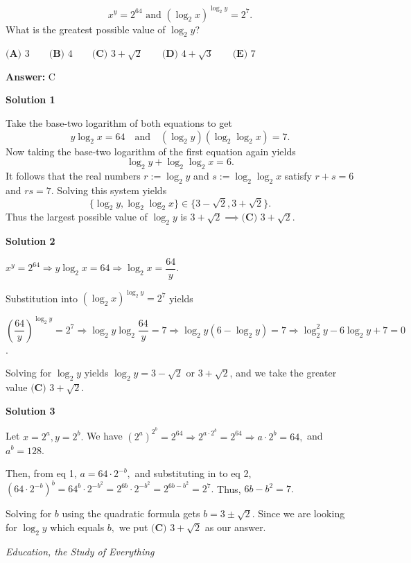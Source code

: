 \begin{enumerate}
 \[x^y=2^{64}\text{ and }(\log_2{x})^{\log_2{y}}=2^{7}.\]
What is the greatest possible value of $\log_2{y}$?


 $\textbf{(A) }3 \qquad \textbf{(B) }4 \qquad \textbf{(C) }3+\sqrt{2} \qquad \textbf{(D) }4+\sqrt{3} \qquad \textbf{(E) }7$

 \textbf{Answer: }C



\textbf{Solution 1}

Take the base-two logarithm of both equations to get
 \[y\log_2 x = 64\quad\text{and}\quad (\log_2 y)(\log_2\log_2 x) = 7.\]Now taking the base-two logarithm of the first equation again yields
 \[\log_2 y + \log_2\log_2 x = 6.\]It follows that the real numbers $r:=\log_2 y$ and $s:=\log_2\log_2 x$ satisfy $r+s=6$ and $rs = 7$. Solving this system yields
 \[\{\log_2 y,\log_2\log_2 x\}\in\{3-\sqrt 2, 3 + \sqrt 2\}.\]Thus the largest possible value of $\log_2 y$ is $3+\sqrt 2 \implies \boxed{\textbf{(C) }3+\sqrt{2}}$.

 



\textbf{Solution 2}

$x^y=2^{64} \Rightarrow y\log_2{x}=64 \Rightarrow \log_2{x}=\dfrac{64}{y}$.

 Substitution into $(\log_2{x})^{\log_2{y}}=2^{7}$ yields

 $\left(\dfrac{64}{y}\right)^{\log_2{y}}=2^{7} \Rightarrow \log_2{y}\log_2{\dfrac{64}{y}}=7 \Rightarrow \log_2{y}(6-\log_2{y})=7 \Rightarrow \log^2_2{y}-6\log_2{y}+7=0$.

 Solving for $\log_2{y}$ yields $\log_2{y}=3-\sqrt{2}$ or $3+\sqrt{2}$, and we take the greater value $\boxed{\textbf{(C) }3+\sqrt{2}}$.

 



\textbf{Solution 3}

Let $x = 2^a, y = 2^b.$ We have $(2^a)^{2^b} = 2^{64} \Rightarrow 2^{a\cdot 2^b} = 2^{64} \Rightarrow a\cdot 2^b = 64,$ and $a^b = 128$.

 Then, from eq 1, $a = 64\cdot 2^{-b},$ and substituting in to eq 2, $(64\cdot 2^{-b})^b = 64^b\cdot 2^{-b^2} = 2^{6b}\cdot 2^{-b^2} = 2^{6b-b^2} = 2^{7}.$ Thus, $6b-b^2 = 7.$

 Solving for $b$ using the quadratic formula gets $b = 3 \pm \sqrt{2}.$ Since we are looking for $\log_2{y}$ which equals $b,$ we put $\boxed{\textbf{(C) }3+\sqrt{2}}$ as our answer.

 \textit{Education, the Study of Everything}


\end{enumerate}
